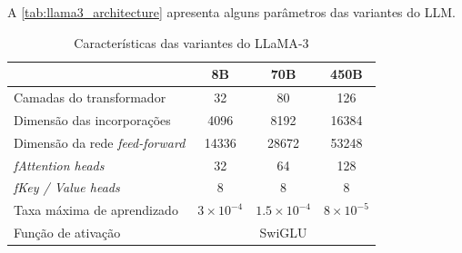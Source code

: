 A \autoref{tab:llama3_architecture} apresenta alguns parâmetros das variantes do \ac{LLM}.

\begin{table}[ht]
      \caption{\small Características das variantes do \ac{LLaMA}-3}
      \centering
      \begin{tabular}{l|ccc}
            \hline
                                                   & 8B                                                                   & 70B                                      & 450B                                   \\ \hline
            Camadas do transformador               & 32                                                                   & 80                                       & 126                                    \\
            Dimensão das incorporações             & 4096                                                                 & 8192                                     & 16384                                  \\
            Dimensão da rede \textit{feed-forward} & 14336                                                                & 28672                                    & 53248                                  \\
            \textit{fAttention heads}              & 32                                                                   & 64                                       & 128                                    \\
            \textit{fKey / Value heads}            & 8                                                                    & 8                                        & 8                                      \\
            Taxa máxima de aprendizado             & \begin{math}3 \times 10^{-4}\end{math}                               & \begin{math}1.5 \times 10^{-4}\end{math} & \begin{math}8 \times 10^{-5}\end{math} \\
            Função de ativação                     & \multicolumn{3}{c}{\ac{SwiGLU}}                                                                                                                          \\

\end{tabular}
\end{table}
